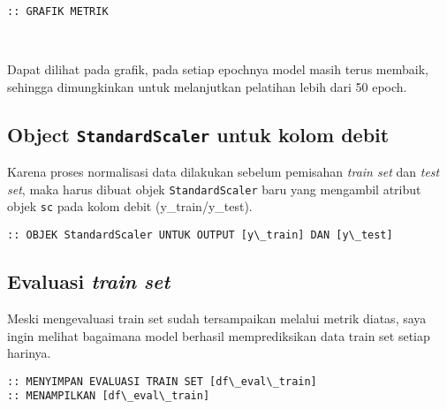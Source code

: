 \documentclass[11pt]{article}
\begin{document}
    \begin{Verbatim}[commandchars=\\\{\}]
:: GRAFIK METRIK
    \end{Verbatim}

    \begin{center}
    \end{center}
    { \hspace*{\fill} \\}
    
    Dapat dilihat pada grafik, pada setiap epochnya model masih terus
membaik, sehingga dimungkinkan untuk melanjutkan pelatihan lebih dari 50
epoch.

    \hypertarget{object-standardscaler-untuk-kolom-debit}{%
\subsection{\texorpdfstring{Object \texttt{StandardScaler} untuk kolom
debit}{Object StandardScaler untuk kolom debit}}\label{object-standardscaler-untuk-kolom-debit}}

Karena proses normalisasi data dilakukan sebelum pemisahan \emph{train
set} dan \emph{test set}, maka harus dibuat objek
\texttt{StandardScaler} baru yang mengambil atribut objek \texttt{sc}
pada kolom debit (y\_train/y\_test).

    \begin{Verbatim}[commandchars=\\\{\}]
:: OBJEK StandardScaler UNTUK OUTPUT [y\_train] DAN [y\_test]
    \end{Verbatim}

    \hypertarget{evaluasi-train-set}{%
\subsection{\texorpdfstring{Evaluasi \emph{train
set}}{Evaluasi train set}}\label{evaluasi-train-set}}

Meski mengevaluasi train set sudah tersampaikan melalui metrik diatas,
saya ingin melihat bagaimana model berhasil memprediksikan data train
set setiap harinya.

    \begin{Verbatim}[commandchars=\\\{\}]
:: MENYIMPAN EVALUASI TRAIN SET [df\_eval\_train]
:: MENAMPILKAN [df\_eval\_train]
    \end{Verbatim}
\end{document}
